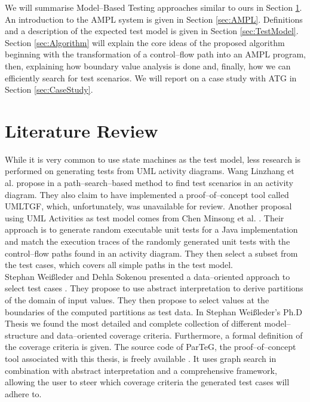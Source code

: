 \documentclass[runningheads,a4paper]{llncs}%
\begin{document}
We will summarise Model--Based Testing approaches similar to ours in Section \ref{sec:LiteratureReview}. An introduction to the AMPL system is given in Section \ref{sec:AMPL}. Definitions and a description of the expected test model is given in Section \ref{sec:TestModel}. Section \ref{sec:Algorithm} will explain the core ideas of the proposed algorithm beginning with the transformation of a control--flow path into an AMPL program, then, explaining how boundary value analysis is done and, finally, how we can efficiently search for test scenarios. We will report on a case study with ATG in Section \ref{sec:CaseStudy}.%
\section{Literature Review}%
\label{sec:LiteratureReview}%
While it is very common to use state machines as the test model, less research is performed on generating tests from UML activity diagrams. Wang Linzhang et al. propose in \cite{Linzhang04GeneratingTestCasefromActivityGrayBoxMethod} a path--search--based method to find test scenarios in an activity diagram. They also claim to have implemented a proof--of--concept tool called UMLTGF, which, unfortunately, was unavailable for review. Another proposal using UML Activities as test model comes from Chen Minsong et al. \cite{mingsong2006automatic}. Their approach is to generate random executable unit tests for a Java implementation and match the execution traces of the randomly generated unit tests with the control--flow paths found in an activity diagram. They then select a subset from the test cases, which covers all simple paths in the test model.\\%
Stephan Wei{\ss}leder and Dehla Sokenou presented a data--oriented approach to select test cases \cite{weissleder2008automatic}. They propose to use abstract interpretation to derive partitions of the domain of input values. They then propose to select values at the boundaries of the computed partitions as test data. In Stephan Wei{\ss}leder's Ph.D Thesis \cite{ParTeG} we found the most detailed and complete collection of different model--structure and data--oriented coverage criteria. Furthermore, a formal definition of the coverage criteria is given. The source code of ParTeG, the proof--of--concept tool associated with this thesis, is freely available \cite{PartegWebsite}. It uses graph search in combination with abstract interpretation and a comprehensive framework, allowing the user to steer which coverage criteria the generated test cases will adhere to.\\%
\end{document}
